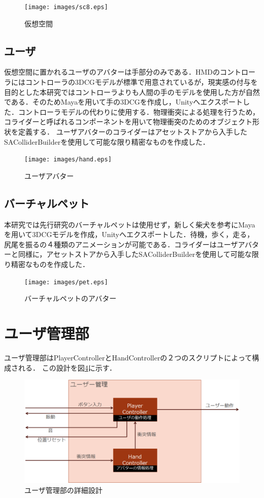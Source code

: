 \begin{figure}[H]
\centering
\texttt{[image: images/sc8.eps]}
\caption{仮想空間}
\label{fig:vr}
\end{figure} 

\subsection{ユーザ}

仮想空間に置かれるユーザのアバターは手部分のみである．HMDのコントローラにはコントローラの3DCGモデルが標準で用意されているが，現実感の付与を目的とした本研究ではコントローラよりも人間の手のモデルを使用した方が自然である．そのためMayaを用いて手の3DCGを作成し，Unityへエクスポートした．コントローラモデルの代わりに使用する．物理衝突による処理を行うため，コライダーと呼ばれるコンポーネントを用いて物理衝突のためのオブジェクト形状を定義する．
ユーザアバターのコライダーはアセットストアから入手したSAColliderBuilderを使用して可能な限り精密なものを作成した．

\begin{figure}[H]
\centering
\texttt{[image: images/hand.eps]}
\caption{ユーザアバター}
\label{fig:hand}
\end{figure} 

\subsection{バーチャルペット}

本研究では先行研究のバーチャルペットは使用せず，新しく柴犬を参考にMayaを用いて3DCGモデルを作成，Unityへエクスポートした．待機，歩く，走る，尻尾を振るの４種類のアニメーションが可能である．コライダーはユーザアバターと同様に，アセットストアから入手したSAColliderBuilderを使用して可能な限り精密なものを作成した．

\begin{figure}[H]
\centering
\texttt{[image: images/pet.eps]}
\caption{バーチャルペットのアバター}
\label{fig:pet}
\end{figure} 

\section{ユーザ管理部}

ユーザ管理部はPlayerControllerとHandControllerの２つのスクリプトによって構成される．
この設計を図\ref{fig:design3}に示す．

\begin{figure}[H]
\centering
\includegraphics*[width=15cm,clip]{images/design3.eps}
\caption{ユーザ管理部の詳細設計}
\label{fig:design3}
\end{figure}

